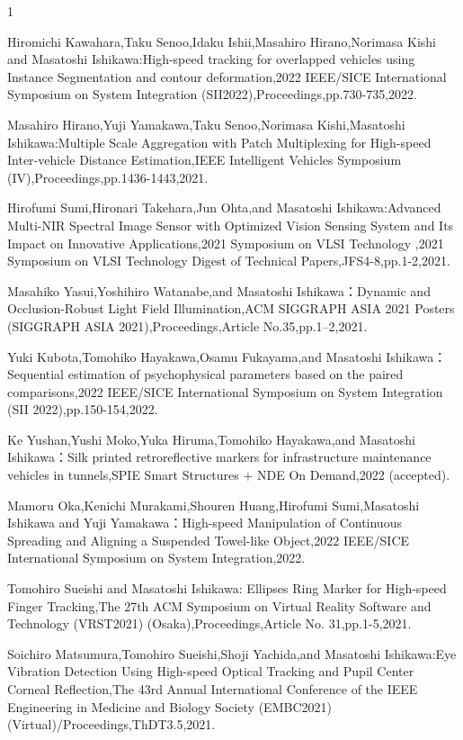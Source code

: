 \begin{査読付}{1}


Hiromichi Kawahara,Taku Senoo,Idaku Ishii,Masahiro Hirano,Norimasa Kishi and Masatoshi Ishikawa:High-speed tracking for overlapped vehicles using Instance Segmentation and contour deformation,2022 IEEE/SICE International Symposium on System Integration (SII2022),Proceedings,pp.730-735,2022.

Masahiro Hirano,Yuji Yamakawa,Taku Senoo,Norimasa Kishi,Masatoshi Ishikawa:Multiple Scale Aggregation with Patch Multiplexing for High-speed Inter-vehicle Distance Estimation,IEEE Intelligent Vehicles Symposium (IV),Proceedings,pp.1436-1443,2021.

Hirofumi Sumi,Hironari Takehara,Jun Ohta,and Masatoshi Ishikawa:Advanced Multi-NIR Spectral Image Sensor with Optimized Vision Sensing System and Its Impact on Innovative Applications,2021 Symposium on VLSI Technology ,2021 Symposium on VLSI Technology Digest of Technical Papers,JFS4-8,pp.1-2,2021.

Masahiko Yasui,Yoshihiro Watanabe,and Masatoshi Ishikawa：Dynamic and Occlusion-Robust Light Field Illumination,ACM SIGGRAPH ASIA 2021 Posters (SIGGRAPH ASIA 2021),Proceedings,Article No.35,pp.1–2,2021.

Yuki Kubota,Tomohiko Hayakawa,Osamu Fukayama,and Masatoshi Ishikawa：Sequential estimation of psychophysical parameters based on the paired comparisons,2022 IEEE/SICE International Symposium on System Integration (SII 2022),pp.150-154,2022.

Ke Yushan,Yushi Moko,Yuka Hiruma,Tomohiko Hayakawa,and Masatoshi Ishikawa：Silk printed retroreflective markers for infrastructure maintenance vehicles in tunnels,SPIE Smart Structures + NDE On Demand,2022 (accepted).

Mamoru Oka,Kenichi Murakami,Shouren Huang,Hirofumi Sumi,Masatoshi Ishikawa and Yuji Yamakawa：High-speed Manipulation of Continuous Spreading and Aligning a Suspended Towel-like Object,2022 IEEE/SICE International Symposium on System Integration,2022.

Tomohiro Sueishi and Masatoshi Ishikawa:  Ellipses Ring Marker for High-speed Finger Tracking,The 27th ACM Symposium on Virtual Reality Software and Technology (VRST2021) (Osaka),Proceedings,Article No. 31,pp.1-5,2021.


Soichiro Matsumura,Tomohiro Sueishi,Shoji Yachida,and Masatoshi Ishikawa:Eye Vibration Detection Using High-speed Optical Tracking and Pupil Center Corneal Reflection,The 43rd Annual International Conference of the IEEE Engineering in Medicine and Biology Society (EMBC2021) (Virtual)/Proceedings,ThDT3.5,2021.


\end{査読付}
